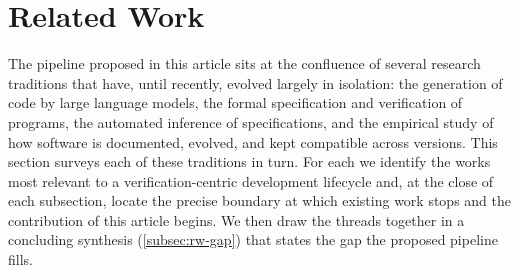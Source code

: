 \section{Related Work}\label{sec:related_work}

The pipeline proposed in this article sits at the confluence of several research
traditions that have, until recently, evolved largely in isolation: the
generation of code by large language models, the formal specification and
verification of programs, the automated inference of specifications, and the
empirical study of how software is documented, evolved, and kept compatible
across versions. This section surveys each of these traditions in turn. For each
we identify the works most relevant to a verification-centric development
lifecycle and, at the close of each subsection, locate the precise boundary at
which existing work stops and the contribution of this article begins. We then
draw the threads together in a concluding synthesis
(\cref{subsec:rw-gap}) that states the gap the proposed pipeline fills.












